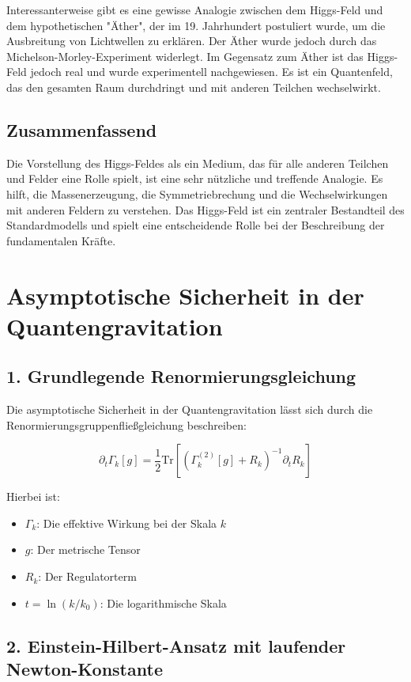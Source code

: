 \documentclass{article}
\begin{document}
	Interessanterweise gibt es eine gewisse Analogie zwischen dem Higgs-Feld und dem hypothetischen "Äther", der im 19. Jahrhundert postuliert wurde, um die Ausbreitung von Lichtwellen zu erklären. Der Äther wurde jedoch durch das Michelson-Morley-Experiment widerlegt. Im Gegensatz zum Äther ist das Higgs-Feld jedoch real und wurde experimentell nachgewiesen. Es ist ein Quantenfeld, das den gesamten Raum durchdringt und mit anderen Teilchen wechselwirkt.
	
	\subsection{Zusammenfassend}
	
	Die Vorstellung des Higgs-Feldes als ein Medium, das für alle anderen Teilchen und Felder eine Rolle spielt, ist eine sehr nützliche und treffende Analogie. Es hilft, die Massenerzeugung, die Symmetriebrechung und die Wechselwirkungen mit anderen Feldern zu verstehen. Das Higgs-Feld ist ein zentraler Bestandteil des Standardmodells und spielt eine entscheidende Rolle bei der Beschreibung der fundamentalen Kräfte.
\section{Asymptotische Sicherheit in der Quantengravitation}

\subsection{1. Grundlegende Renormierungsgleichung}

Die asymptotische Sicherheit in der Quantengravitation lässt sich durch die Renormierungsgruppenfließgleichung beschreiben:

\[
\partial_t \Gamma_k[g] = \frac{1}{2} \text{Tr}\left[\left(\Gamma_k^{(2)}[g] + R_k\right)^{-1} \partial_t R_k\right]
\]

Hierbei ist:

\begin{itemize}
	\item $\Gamma_k$: Die effektive Wirkung bei der Skala $k$
	\item $g$: Der metrische Tensor
	\item $R_k$: Der Regulatorterm
	\item $t = \ln(k/k_0)$: Die logarithmische Skala
\end{itemize}

\subsection{2. Einstein-Hilbert-Ansatz mit laufender Newton-Konstante}
\end{document}
